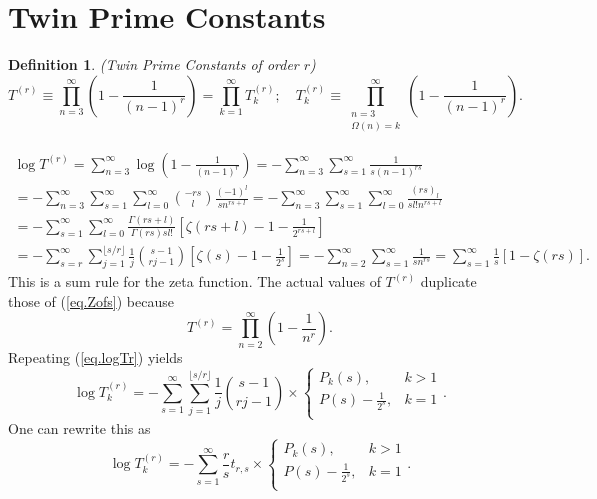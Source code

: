 \documentclass{amsart}
\newtheorem{defn}{Definition}
\begin{document}
\section{Twin Prime Constants}
\begin{defn}
(Twin Prime Constants of order $r$)
\begin{equation}
T^{(r)}\equiv \prod_{n=3}^\infty \left(1-\frac{1}{(n-1)^r} \right)
=\prod_{k=1}^\infty T_k^{(r)};\quad 
T_k^{(r)}\equiv \prod_{\substack{n=3\\ \Omega(n)=k}}^\infty 
\left(1-\frac{1}{(n-1)^r} \right)
\label{eq.TprDef}
.
\end{equation}
\end{defn}
\begin{gather}
\log T^{(r)}
=
\sum_{n=3}^\infty \log \left(1-\frac{1}{(n-1)^r}\right)
=
- \sum_{n=3}^\infty \sum_{s=1}^\infty \frac{1}{s (n-1)^{rs}}
\label{eq.logTr}
\\
=
- \sum_{n=3}^\infty \sum_{s=1}^\infty \sum_{l=0}^\infty \binom{-rs}{l}
  \frac{(-1)^l}{s n^{rs+l}}
=
- \sum_{n=3}^\infty \sum_{s=1}^\infty \sum_{l=0}^\infty \frac{(rs)_l}{sl! n^{rs+l}}
\nonumber
\\
=
- \sum_{s=1}^\infty \sum_{l=0}^\infty
  \frac{\Gamma(rs+l)}{\Gamma(rs)sl!}\left[\zeta(rs+l)-1-\frac{1}{2^{rs+l}}\right]
\nonumber
\\
=
- \sum_{s=r}^\infty \sum_{j=1}^{\lfloor s/r\rfloor}
  \frac{1}{j}\binom{s-1}{rj-1}\left[\zeta(s)-1-\frac{1}{2^s}\right]
=
- \sum_{n=2}^\infty \sum_{s=1}^\infty \frac{1}{s n^{rs}}
=
\sum_{s=1}^\infty \frac{1}{s}\left[1-\zeta(rs)\right]
.
\nonumber
\end{gather}
This is a sum rule for the zeta function. The actual values of $T^{(r)}$
duplicate those of (\ref{eq.Zofs}) because
\begin{equation}
T^{(r)} = 
\prod_{n=2}^\infty (1-\frac{1}{n^r})
.
\end{equation}
Repeating (\ref{eq.logTr}) yields
\begin{equation}
\log T_k^{(r)}
=
- \sum_{s=1}^\infty \sum_{j=1} ^{\lfloor s/r\rfloor}\frac{1}{j}
 \binom{s-1}{rj-1}\times
\left\{ \begin{array}{ll} P_k(s), & k>1 \\
P(s)-\frac{1}{2^s}, & k=1 \\
\end{array}
\right.
\label{eq.Akr}
.
\end{equation}
One can rewrite this as
\begin{equation}
\log T_k^{(r)}
=
- \sum_{s=1}^\infty \frac{r}{s}t_{r,s}
\times
\left\{ \begin{array}{ll} P_k(s), & k>1 \\
P(s)-\frac{1}{2^s}, & k=1 \\
\end{array}
\right.
.
\end{equation}
\end{document}
